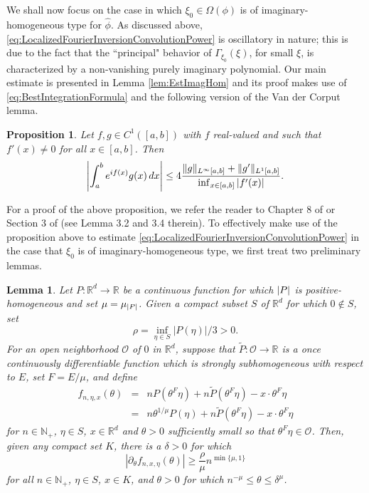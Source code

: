 \documentclass[11pt]{article}
\newtheorem{lemma}[theorem]{Lemma}
\newtheorem{proposition}[theorem]{Proposition}
\begin{document}
\noindent We shall now focus on the case in which $\xi_0\in\Omega(\phi)$ is of imaginary-homogeneous type for $\widehat{\phi}$. As discussed above,  \eqref{eq:LocalizedFourierInversionConvolutionPower} is oscillatory in nature; this is due to the fact that the ``principal" behavior of $\Gamma_{\xi_0}(\xi)$, for small $\xi$, is characterized by a non-vanishing purely imaginary polynomial. Our main estimate is presented in Lemma \ref{lem:EstImagHom} and its proof makes use of \eqref{eq:BestIntegrationFormula} and the following version of the Van der Corput lemma.

\begin{proposition}\label{prop:VanderCorput}
Let $f,g\in C^1([a,b])$ with $f$ real-valued and such that $f'(x)\neq 0$ for all $x\in [a,b]$. Then
\begin{equation*}
\abs{\int_a^b e^{if(x)}g(x)\,dx}\leq 4\frac{\|g\|_{L^\infty[a,b]}+\|g'\|_{L^1[a,b]}}{\inf_{x\in[a,b]}\abs{f'(x)}}.
\end{equation*}
\end{proposition}

\noindent For a proof of the above proposition, we refer the reader to Chapter 8 of \cite{SteinHarmonicAnalysis} or Section 3 of \cite{Randles2015} (see Lemma 3.2 and 3.4 therein).  To effectively make use of the proposition above to estimate \eqref{eq:LocalizedFourierInversionConvolutionPower} in the case that $\xi_0$ is of imaginary-homogeneous type, we first treat two preliminary lemmas. 

\begin{lemma}\label{lem:PhaseDerivativeEstimate}
Let $P:\mathbb{R}^d\to\mathbb{R}$ be a continuous function for which $\abs{P}$ is positive-homogeneous and set $\mu=\mu_{\abs{P}}$. Given a compact subset $S$ of $\mathbb{R}^d$ for which $0\notin S$, set
\begin{equation*}
    \rho=\inf_{\eta\in S}|P(\eta)|/3>0.
\end{equation*}
For an open neighborhood $\mathcal{O}$ of $0$ in $\mathbb{R}^d$, suppose that $\widetilde{P}:\mathcal{O}\to\mathbb{R}$ is a once continuously differentiable function which is strongly subhomogeneous with respect to $E$, set $F=E/\mu$, and define
\begin{eqnarray*}
f_{n,\eta,x}(\theta)&=&nP(\theta^F\eta)+n\widetilde{P}(\theta^F\eta)-x\cdot \theta^F\eta\\
&=&n\theta^{1/\mu}P(\eta)+n\widetilde{P}(\theta^{F}\eta)-x\cdot \theta^{F}\eta
\end{eqnarray*}
for $n\in\mathbb{N}_+$, $\eta\in S$, $x\in\mathbb{R}^d$ and $\theta>0$ sufficiently small so that $\theta^F\eta\in\mathcal{O}$. Then, given any compact set $K$, there is a $\delta>0$ for which
\begin{equation*}
    |\partial_\theta f_{n,x,\eta}(\theta)|\geq \frac{\rho}{\mu} n^{\min\{\mu,1\}}
\end{equation*}
for all $n\in\mathbb{N}_+$, $\eta\in S$,  $x\in K$, and $\theta>0$ for which $n^{-\mu}\leq \theta\leq \delta^\mu$.
\end{lemma}
\end{document}
